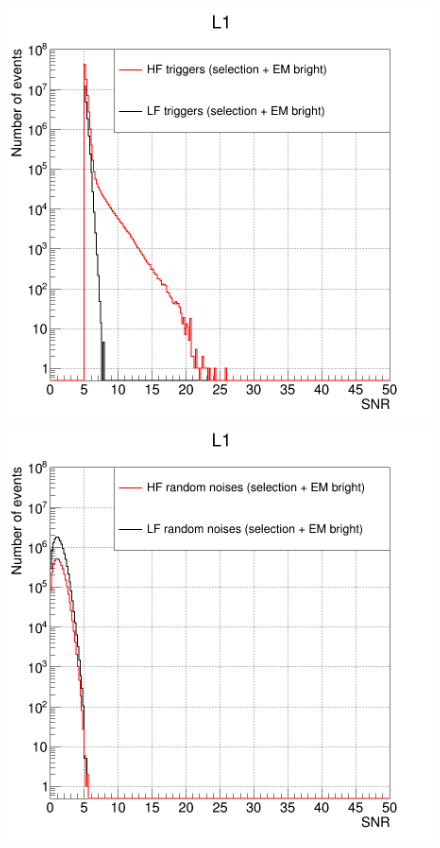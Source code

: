 \begin{figure}[ht]
\begin{minipage}{0.45\linewidth}
  \end{minipage}
  \begin{minipage}{0.45\linewidth}
    \centering
    \includegraphics[width=\linewidth]{sectionFAR/O4/cTrig_good.png}
  \end{minipage}
  \hfill
  \begin{minipage}{0.45\linewidth}
    \centering
    \includegraphics[width=\linewidth]{sectionFAR/O4/cRand_good.png}

\end{minipage}
\end{figure}
